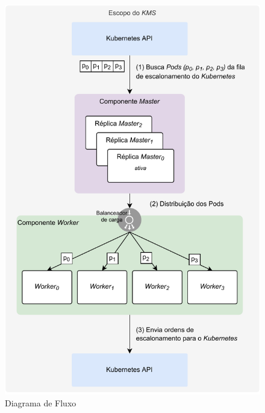 


\begin{figure}[h!]
	\caption{\label{fig:relacao-master-worker}Diagrama de Fluxo}
	\centering
	\includegraphics[width=.60\linewidth]{assets/relacao-master-worker.pdf}
\end{figure}


